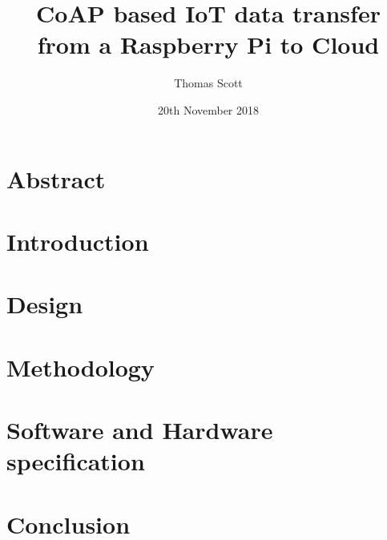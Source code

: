\documentclass[11pt]{article}
\title{CoAP based IoT data transfer from a Raspberry Pi to Cloud}
\author{Thomas Scott}
\date{20th November 2018}
\begin{document}
	\maketitle
	\newpage

	\section{Abstract}
	

	\section{Introduction}
	

	\section{Design}
	

	\section{Methodology}
	

	\section{Software and Hardware specification}
	

	\section{Conclusion}
	

	\printglossaries

	
	
\end{document}
